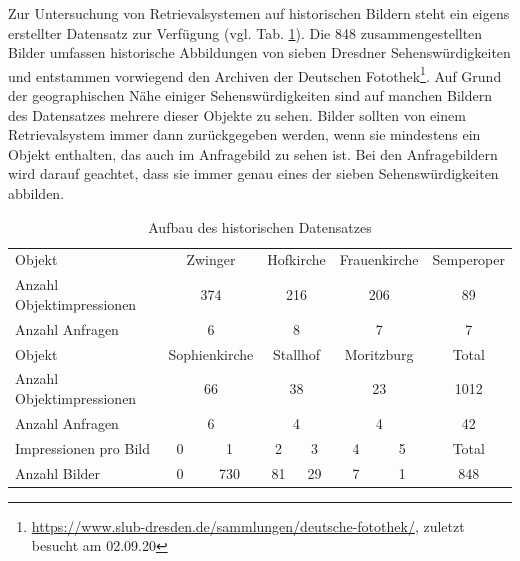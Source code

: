 Zur Untersuchung von Retrievalsystemen auf historischen Bildern steht ein eigens erstellter Datensatz zur Verfügung (vgl. Tab. \ref{hist4d_data}). Die 848 zusammengestellten Bilder umfassen historische Abbildungen von sieben Dresdner Sehenswürdigkeiten und entstammen vorwiegend den Archiven der Deutschen Fotothek\footnote{\url{https://www.slub-dresden.de/sammlungen/deutsche-fotothek/}, zuletzt besucht am 02.09.20}. Auf Grund der geographischen Nähe einiger Sehenswürdigkeiten sind auf manchen Bildern des Datensatzes mehrere dieser Objekte zu sehen. Bilder sollten von einem Retrievalsystem immer dann zurückgegeben werden, wenn sie mindestens ein Objekt enthalten, das auch im Anfragebild zu sehen ist. Bei den Anfragebildern wird darauf geachtet, dass sie immer genau eines der sieben Sehenswürdigkeiten abbilden.
\begin{table}[h]
\centering

\begin{tabular}{l|c|c|c|c|c|c|c}
\rowcolor[HTML]{C0C0C0} 
Objekt &
  \multicolumn{2}{c|}{\cellcolor[HTML]{C0C0C0}Zwinger} &
  \multicolumn{2}{c|}{\cellcolor[HTML]{C0C0C0}Hofkirche} &
  \multicolumn{2}{c|}{\cellcolor[HTML]{C0C0C0}Frauenkirche} &
  Semperoper \\
Anzahl Objektimpressionen & \multicolumn{2}{c|}{374} & \multicolumn{2}{c|}{216} & \multicolumn{2}{c|}{206} & 89    \\
Anzahl Anfragen           & \multicolumn{2}{c|}{6}   & \multicolumn{2}{c|}{8}   & \multicolumn{2}{c|}{7}   & 7     \\ \hline
\rowcolor[HTML]{C0C0C0} 
Objekt &
  \multicolumn{2}{c|}{\cellcolor[HTML]{C0C0C0}Sophienkirche} &
  \multicolumn{2}{c|}{\cellcolor[HTML]{C0C0C0}Stallhof} &
  \multicolumn{2}{c|}{\cellcolor[HTML]{C0C0C0}Moritzburg} &
  Total \\
Anzahl Objektimpressionen & \multicolumn{2}{c|}{66}  & \multicolumn{2}{c|}{38}  & \multicolumn{2}{c|}{23}  & 1012  \\
Anzahl Anfragen           & \multicolumn{2}{c|}{6}   & \multicolumn{2}{c|}{4}   & \multicolumn{2}{c|}{4}   & 42    \\ \hline
\rowcolor[HTML]{C0C0C0} 
Impressionen pro Bild     & \hspace{2.5mm} 0 \hspace{2.5mm}         & 1           & \hspace{1.1mm} 2 \hspace{1.1mm}           & 3          & \hspace{2mm} 4 \hspace{2mm}           & 5          & Total \\
Anzahl Bilder             & 0          & 730         & 81          & 29         & 7           & 1          & 848  
\end{tabular}%

\caption{Aufbau des historischen Datensatzes}
\label{hist4d_data}
\end{table}

